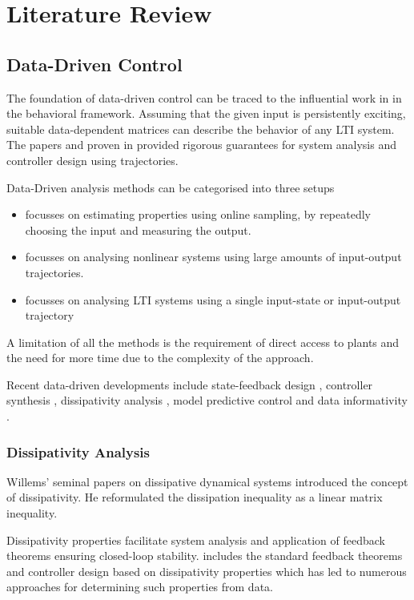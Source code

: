 \chapter{Literature Review}\doublespacing
\section{Data-Driven Control}
The foundation of data-driven control can be traced to the influential work in \cite{willems2005note} in the behavioral framework. Assuming that the given input is persistently exciting, suitable data-dependent matrices can describe the behavior of any LTI system. The papers \cite{Berberich2019a} and proven in \cite{Waarde2020} provided rigorous guarantees for system analysis and controller design using trajectories.

Data-Driven analysis methods can be categorised into three setups
\begin{itemize}
\item \cite{Wahlberg2010,Rojas2012,Tanemura2019,Romer2019c,Mueller2017} focusses on estimating properties using online sampling, by repeatedly choosing the input and measuring the output.
\item \cite{Montenbruck2016a,Romer2017a,Sharf2020,Romer2019b,Martin2020} focusses on analysing nonlinear systems using large amounts of input-output trajectories.
\item \cite{Maupong2017,Romer2019a,Koch2020,Koch2020a,Saeki2020} focusses on analysing LTI systems using a single input-state or input-output trajectory 
\end{itemize}
A limitation of all the methods is the requirement of direct access to plants and the need for more time due to the complexity of the approach.

Recent data-driven developments include state-feedback design \cite{Persis2020}, controller synthesis \cite{Berberich2019c}, dissipativity analysis \cite{Maupong2017,Romer2019a,Koch2020}, model predictive control \cite{Coulson2019,Berberich2019b} and data informativity \cite{8960476}.
\subsection{Dissipativity Analysis}
Willems' seminal papers \cite{Willems1972DissipativeDS,Willems1972DissipativeDS2} on dissipative dynamical systems introduced the concept of dissipativity. He reformulated the dissipation inequality as a linear matrix inequality.

Dissipativity properties facilitate system analysis and application of feedback theorems ensuring closed-loop stability. \cite{Zames1966,Schaft2000} includes the standard feedback theorems and controller design based on dissipativity properties which has led to numerous approaches for determining such properties from data.

